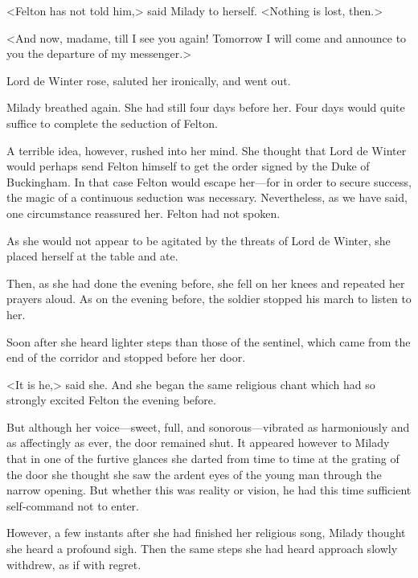 <Felton has not told him,> said Milady to herself. <Nothing is lost, then.> 

<And now, madame, till I see you again! Tomorrow I will come and announce to you the departure of my messenger.> 

Lord de Winter rose, saluted her ironically, and went out. 

Milady breathed again. She had still four days before her. Four days would quite suffice to complete the seduction of Felton. 

A terrible idea, however, rushed into her mind. She thought that Lord de Winter would perhaps send Felton himself to get the order signed by the Duke of Buckingham. In that case Felton would escape her---for in order to secure success, the magic of a continuous seduction was necessary. Nevertheless, as we have said, one circumstance reassured her. Felton had not spoken. 

As she would not appear to be agitated by the threats of Lord de Winter, she placed herself at the table and ate. 

Then, as she had done the evening before, she fell on her knees and repeated her prayers aloud. As on the evening before, the soldier stopped his march to listen to her. 

Soon after she heard lighter steps than those of the sentinel, which came from the end of the corridor and stopped before her door. 

<It is he,> said she. And she began the same religious chant which had so strongly excited Felton the evening before. 

But although her voice---sweet, full, and sonorous---vibrated as harmoniously and as affectingly as ever, the door remained shut. It appeared however to Milady that in one of the furtive glances she darted from time to time at the grating of the door she thought she saw the ardent eyes of the young man through the narrow opening. But whether this was reality or vision, he had this time sufficient self-command not to enter. 

However, a few instants after she had finished her religious song, Milady thought she heard a profound sigh. Then the same steps she had heard approach slowly withdrew, as if with regret. 